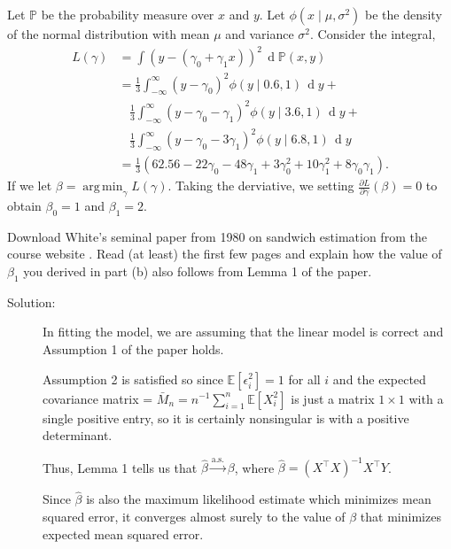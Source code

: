 \documentclass[11pt, letterpaper]{article}
\DeclareMathOperator*{\argmin}{arg\,min}
\begin{document}
{\begin{enumerate}[(a)]
\begin{description}
  Let $\mathbb{P}$ be the probability measure over $x$ and $y$. Let
  $\phi\left(x \mid \mu, \sigma^2\right)$ be the density of the normal
  distribution with mean $\mu$ and variance $\sigma^2$. Consider the integral,
  \begin{align*}
    L\left(\gamma\right)
    &= \int \left(y - \left(\gamma_0 + \gamma_1x\right)\right)^2\,\operatorname{d}\mathbb{P}\left(x, y\right) \\
    &= \frac{1}{3}\int_{-\infty}^\infty\left(y - \gamma_0\right)^2\phi\left(y\mid 0.6, 1\right)\,\operatorname{d}y + \\
    &~~~~\frac{1}{3}\int_{-\infty}^\infty\left(y - \gamma_0 - \gamma_1\right)^2\phi\left(y\mid 3.6, 1\right)\,\operatorname{d}y + \\
    &~~~~\frac{1}{3}\int_{-\infty}^\infty\left(y - \gamma_0 - 3\gamma_1\right)^2\phi\left(y\mid 6.8, 1\right)\,\operatorname{d}y \\
    &= \frac{1}{3}\left(
      62.56 - 22\gamma_0 - 48\gamma_1 + 3\gamma_0^2 + 10\gamma_1^2 + 8\gamma_0\gamma_1
      \right).      
  \end{align*}
  If we let $\beta = \argmin_\gamma L\left(\gamma\right)$. Taking the
  derviative, we setting
  $\frac{\partial L }{\partial \gamma}\left(\beta\right) = 0$ to obtain
  $\beta_0 = 1$ and $\beta_1 = 2$.
\end{description}

{\item Download White's seminal paper from 1980 on sandwich estimation from the course website .  Read (at least) the first few pages and explain how the value of $\beta_1$ you derived in part (b) also follows
  from Lemma 1 of the paper.}

\begin{description}
\item[Solution:] In fitting the model, we are assuming that the linear model is
  correct and Assumption 1 of the paper holds.

  Assumption 2 is satisfied so since $\mathbb{E}\left[\epsilon_i^2\right] = 1$
  for all $i$ and the expected covariance matrix =
  $\bar{M}_n = n^{-1}\sum_{i=1}^n\mathbb{E}\left[X_i^2\right]$ is just a matrix
  $1 \times 1$ with a single positive entry, so it is certainly nonsingular is
  with a positive determinant.

  Thus, Lemma 1 tells us that $\hat{\beta} \xrightarrow {\mathrm{a.s.}} \beta$,
  where $\hat{\beta} = \left(X^\intercal X\right)^{-1} X^\intercal Y$.

  Since $\hat{\beta}$ is also the maximum likelihood estimate which minimizes
  mean squared error, it converges almost surely to the value of $\beta$ that
  minimizes expected mean squared error.
\end{description}


\end{enumerate}}
\end{document}
